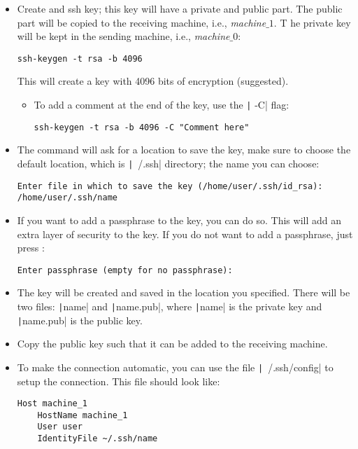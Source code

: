 \begin{itemize}
    \item Create and ssh key; this key will have a private and public part.
    The public part will be copied to the receiving machine, i.e.,
    \textit{machine$\_1$}. T he private key will be kept in the sending machine,
    i.e., \textit{machine$\_0$}:
    \begin{verbatim}
ssh-keygen -t rsa -b 4096
    \end{verbatim}
    This will create a key with 4096 bits of encryption (suggested).
    \begin{itemize}
        \item To add a comment at the end of the key, use the
        \texttt| -C| flag:
        \begin{verbatim}
ssh-keygen -t rsa -b 4096 -C "Comment here"
        \end{verbatim}
    \end{itemize}
    \item The command will ask for a location to save the key, make sure to
    choose the default location, which is \texttt|~/.ssh| directory;
    the name you can choose:
    \begin{verbatim}
Enter file in which to save the key (/home/user/.ssh/id_rsa): /home/user/.ssh/name
    \end{verbatim}
    \item If you want to add a passphrase to the key, you can do so. This will
    add an extra layer of security to the key. If you do not want to add a
    passphrase, just press :
    \begin{verbatim}
Enter passphrase (empty for no passphrase):
    \end{verbatim}
    \item The key will be created and saved in the location you specified. There
    will be two files: \texttt|name| and \texttt|name.pub|,
    where \texttt|name| is the private key and
    \texttt|name.pub| is the public key.
    \item Copy the public key such that it can be added to the receiving
    machine.
    \item To make the connection automatic, you can use the file
    \texttt|~/.ssh/config| to setup the connection. This file should
    look like:
    \begin{verbatim}
Host machine_1
    HostName machine_1
    User user
    IdentityFile ~/.ssh/name
    \end{verbatim}
\end{itemize}

